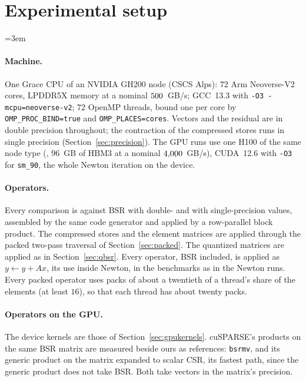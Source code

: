 \documentclass[sigconf,balance=false]{acmart}
\begin{document}
\section{Experimental setup}
\label{sec:plan}

{\emergencystretch=3em
\paragraph{Machine.}  One Grace CPU of an NVIDIA GH200 node (CSCS Alps): $72$ Arm
Neoverse-V2 cores, LPDDR5X memory at a nominal $500$~GB/s; GCC~13.3 with
\texttt{-O3 -mcpu=neoverse-v2}; $72$ OpenMP threads, bound one per core by
\texttt{OMP\_PROC\_BIND=true} and \texttt{OMP\_PLACES=cores}.
Vectors and the residual are in double precision throughout; the contraction of the compressed
stores runs in single precision (Section~\ref{sec:precision}).  The GPU runs use one H100 of the same
node type (\gpuDevice{}, $96$~GB of HBM3 at a nominal $4{,}000$~GB/s), CUDA~12.6 with \texttt{-O3} for \texttt{sm\_90}, the whole Newton
iteration on the device.
\par}

\paragraph{Operators.}  Every comparison is against BSR with double- and with single-precision
values, assembled by the same code generator and applied by a row-parallel block product.  The
compressed stores and the element matrices are applied through the packed two-pass traversal of
Section~\ref{sec:packed}.  The quantized matrices are applied as in Section~\ref{sec:qbsr}.  Every operator, BSR included, is
applied as $y \leftarrow y + Ax$, its use inside Newton, in the benchmarks as in the Newton runs.  Every packed operator uses packs of about a
twentieth of a thread's share of the elements (at least $16$), so that each thread has about twenty
packs.

\paragraph{Operators on the GPU.}  The device kernels are those of Section~\ref{sec:gpukernels}.
cuSPARSE's products on the same BSR matrix are measured beside ours as references: \texttt{bsrmv}, and
its generic product on the matrix expanded to scalar CSR, its fastest path, since the generic product
does not take BSR.  Both take vectors in the matrix's precision.
\end{document}
